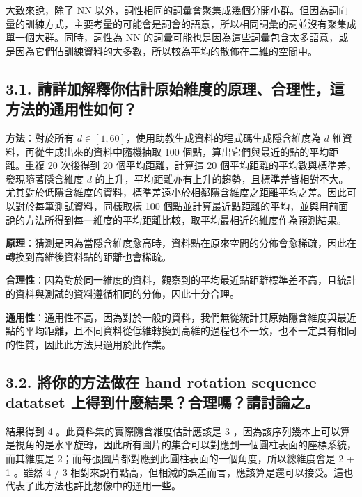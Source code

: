 \documentclass[fleqn,a4paper,12pt]{article}
\begin{document}
大致來說，除了 NN 以外，詞性相同的詞彙會聚集成幾個分開小群。但因為詞向量的訓練方式，主要考量的可能會是詞會的語意，所以相同詞彙的詞並沒有聚集成單一個大群。同時，詞性為 NN 的詞彙可能也是因為這些詞彙包含太多語意，或是因為它們佔訓練資料的大多數，所以較為平均的散佈在二維的空間中。

\subsection*{3.1. 請詳加解釋你估計原始維度的原理、合理性，這方法的通用性如何？}

\par
\textbf{方法}：對於所有 $d \in [1, 60]$，使用助教生成資料的程式碼生成隱含維度為 $d$ 維資料，再從生成出來的資料中隨機抽取 100 個點，算出它們與最近的點的平均距離。重複 20 次後得到 20 個平均距離，計算這 20 個平均距離的平均數與標準差，發現隨著隱含維度 $d$ 的上升，平均距離亦有上升的趨勢，且標準差皆相對不大。尤其對於低隱含維度的資料，標準差遠小於相鄰隱含維度之距離平均之差。因此可以對於每筆測試資料，同樣取樣 100 個點並計算最近點距離的平均，並與用前面說的方法所得到每一維度的平均距離比較，取平均最相近的維度作為預測結果。

\textbf{原理}：猜測是因為當隱含維度愈高時，資料點在原來空間的分佈會愈稀疏，因此在轉換到高維後資料點的距離也會稀疏。

\textbf{合理性}：因為對於同一維度的資料，觀察到的平均最近點距離標準差不高，且統計的資料與測試的資料遵循相同的分佈，因此十分合理。

\textbf{通用性}：通用性不高，因為對於一般的資料，我們無從統計其原始隱含維度與最近點的平均距離，且不同資料從低維轉換到高維的過程也不一致，也不一定具有相同的性質，因此此方法只適用於此作業。

\subsection*{3.2. 將你的方法做在 hand rotation sequence datatset 上得到什麼結果？合理嗎？請討論之。}

結果得到 4 。此資料集的實際隱含維度估計應該是 3 ，因為該序列幾本上可以算是視角的是水平旋轉，因此所有圖片的集合可以對應到一個圓柱表面的座標系統，而其維度是 2；而每張圖片都對應到此圓柱表面的一個角度，所以總維度會是 2 + 1 。雖然 4 / 3 相對來說有點高，但相減的誤差而言，應該算是還可以接受。這也代表了此方法也許比想像中的通用一些。
\end{document}
